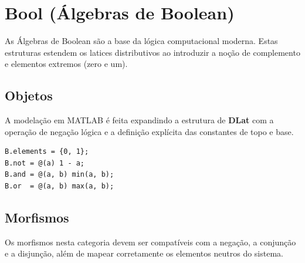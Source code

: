 \section{Bool (Álgebras de Boolean)}

As Álgebras de Boolean são a base da lógica computacional moderna. Estas estruturas estendem os latices distributivos ao introduzir a noção de complemento e elementos extremos (zero e um).

\subsection{Objetos}
A modelação em MATLAB é feita expandindo a estrutura de \textbf{DLat} com a operação de negação lógica e a definição explícita das constantes de topo e base.

\begin{lstlisting}[caption={Operações em Álgebra Booleana}]
B.elements = {0, 1};
B.not = @(a) 1 - a;      
B.and = @(a, b) min(a, b); 
B.or  = @(a, b) max(a, b); 
\end{lstlisting}

\subsection{Morfismos}
Os morfismos nesta categoria devem ser compatíveis com a negação, a conjunção e a disjunção, além de mapear corretamente os elementos neutros do sistema.
